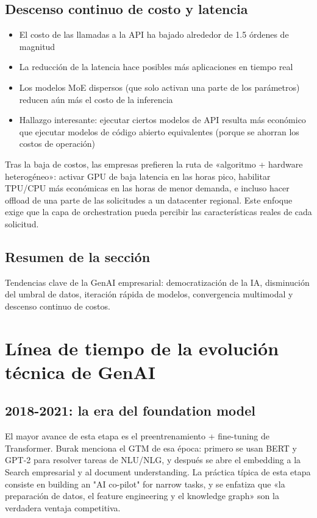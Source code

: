 \documentclass[a4paper]{article}
\begin{document}
\subsection{Descenso continuo de costo y latencia}

\begin{itemize}
    \item El costo de las llamadas a la API ha bajado alrededor de 1.5 órdenes de magnitud
    \item La reducción de la latencia hace posibles más aplicaciones en tiempo real
    \item Los modelos MoE dispersos (que solo activan una parte de los parámetros) reducen aún más el costo de la inferencia
    \item Hallazgo interesante: ejecutar ciertos modelos de API resulta más económico que ejecutar modelos de código abierto equivalentes (porque se ahorran los costos de operación)
\end{itemize}

Tras la baja de costos, las empresas prefieren la ruta de «algoritmo + hardware heterogéneo»: activar GPU de baja latencia en las horas pico, habilitar TPU/CPU más económicas en las horas de menor demanda, e incluso hacer offload de una parte de las solicitudes a un datacenter regional. Este enfoque exige que la capa de orchestration pueda percibir las características reales de cada solicitud.

\subsection{Resumen de la sección}

Tendencias clave de la GenAI empresarial: democratización de la IA, disminución del umbral de datos, iteración rápida de modelos, convergencia multimodal y descenso continuo de costos.

\section{Línea de tiempo de la evolución técnica de GenAI}

\subsection{2018-2021: la era del foundation model}

El mayor avance de esta etapa es el preentrenamiento + fine-tuning de Transformer. Burak menciona el GTM de esa época: primero se usan BERT y GPT-2 para resolver tareas de NLU/NLG, y después se abre el embedding a la Search empresarial y al document understanding. La práctica típica de esta etapa consiste en building an "AI co-pilot" for narrow tasks, y se enfatiza que «la preparación de datos, el feature engineering y el knowledge graph» son la verdadera ventaja competitiva.
\end{document}
